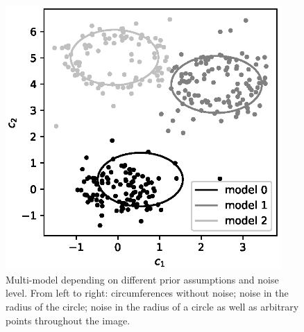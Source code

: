 \documentclass[12pt, twoside]{article}
\numberwithin{equation}{section}
\begin{document}
\begin{figure}[h!]
\begin{minipage}{.32\textwidth}
\end{minipage}
\begin{minipage}{.32\textwidth}
\hspace{-2.3mm}
      \includegraphics[width =  0.935\textwidth]{figures/902.eps}
\end{minipage}
\caption{Multi-model depending on different prior assumptions and noise level. From left to right: circumferences without noise; noise in the radius of the circle; noise in the radius of a circle as well as arbitrary points throughout the image.}
\label{ce:fig3}
\end{figure}
\end{document}

